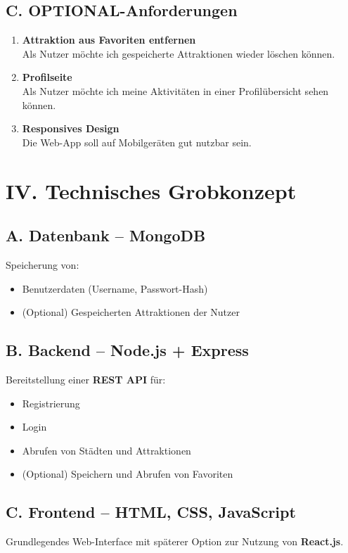 \documentclass[a4paper,12pt]{article}
\begin{document}
    \subsection*{C. OPTIONAL-Anforderungen}
    \begin{enumerate}
        \item \textbf{Attraktion aus Favoriten entfernen} \\
        Als Nutzer möchte ich gespeicherte Attraktionen wieder löschen können.

        \item \textbf{Profilseite} \\
        Als Nutzer möchte ich meine Aktivitäten in einer Profilübersicht sehen können.

        \item \textbf{Responsives Design} \\
        Die Web-App soll auf Mobilgeräten gut nutzbar sein.
    \end{enumerate}

    \section*{IV. Technisches Grobkonzept}
    \subsection*{A. Datenbank – MongoDB}
    Speicherung von:
    \begin{itemize}
        \item Benutzerdaten (Username, Passwort-Hash)
        \item (Optional) Gespeicherten Attraktionen der Nutzer
    \end{itemize}

    \subsection*{B. Backend – Node.js + Express}
    Bereitstellung einer \textbf{REST API} für:
    \begin{itemize}
        \item Registrierung
        \item Login
        \item Abrufen von Städten und Attraktionen
        \item (Optional) Speichern und Abrufen von Favoriten
    \end{itemize}

    \subsection*{C. Frontend – HTML, CSS, JavaScript}
    Grundlegendes Web-Interface mit späterer Option zur Nutzung von \textbf{React.js}.
\end{document}
